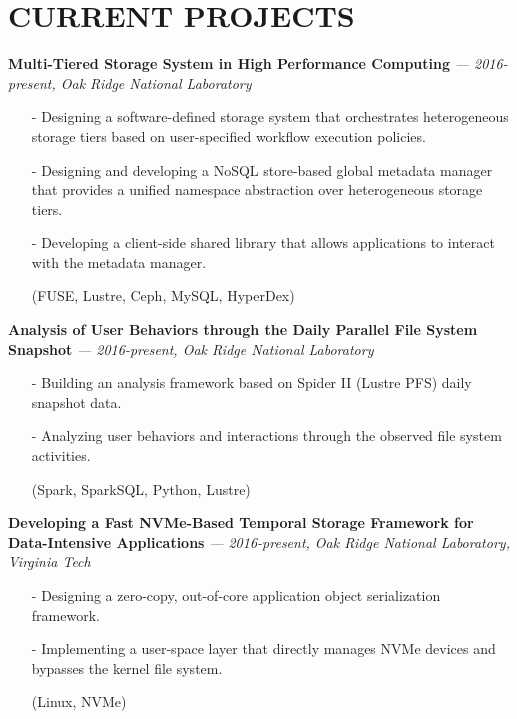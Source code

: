 \section{CURRENT PROJECTS}
\vspace{.03in}
  {\bf Multi-Tiered Storage System in High Performance Computing}
   {\it \footnotesize --- 2016-present, Oak Ridge National Laboratory}
   \begin{itemize}[leftmargin=*]
    \setlength\itemsep{-0.02in}
    \item[-] Designing a software-defined storage system that orchestrates
	     heterogeneous storage tiers based on user-specified workflow execution
             policies.
    \item[-] Designing and developing a NoSQL store-based global metadata manager
	     that provides a unified namespace abstraction over heterogeneous
	     storage tiers.
    \item[-] Developing a client-side shared library that allows applications to interact
             with the metadata manager.
    \item[] {\small(FUSE, Lustre, Ceph, MySQL, HyperDex)}
   \end{itemize}
  \vspace{-0.15in}
  {\bf Analysis of User Behaviors through the Daily Parallel File System Snapshot}
   {\it \footnotesize --- 2016-present, Oak Ridge National Laboratory}
   \begin{itemize}[leftmargin=*]
    \setlength\itemsep{-0.02in}
    \item[-] Building an analysis framework based on Spider II (Lustre PFS) daily snapshot data.
    \item[-] Analyzing user behaviors and interactions through the observed file system activities.
    \item[] {\small(Spark, SparkSQL, Python, Lustre)}
   \end{itemize}
  \vspace{-0.15in}
  {\bf Developing a Fast NVMe-Based Temporal Storage Framework for Data-Intensive Applications}
   {\it \footnotesize --- 2016-present, Oak Ridge National Laboratory, Virginia Tech}
   \begin{itemize}[leftmargin=*]
    \setlength\itemsep{-0.02in}
    \item[-] Designing a zero-copy, out-of-core application object serialization framework.
    \item[-] Implementing a user-space layer that directly manages NVMe
             devices and bypasses the kernel file system.
    \item[] {\small(Linux, NVMe)}
   \end{itemize}
 
